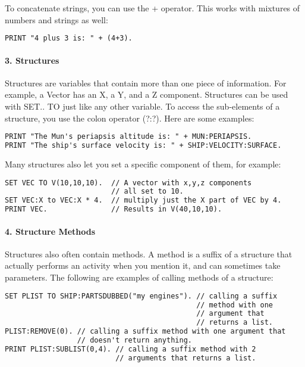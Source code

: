 To concatenate strings, you can use the + operator. This works with mixtures of numbers and strings as well:

\begin{lstlisting}[frame=single,language=XML]
PRINT "4 plus 3 is: " + (4+3).
\end{lstlisting}

\paragraph{3. Structures}
Structures are variables that contain more than one piece of information. For example, a Vector has an X, a Y, and a Z component. Structures can be used with SET.. TO just like any other variable. To access the sub-elements of a structure, you use the colon operator (?:?). Here are some examples:

\begin{lstlisting}[frame=single,language=XML]
PRINT "The Mun's periapsis altitude is: " + MUN:PERIAPSIS.
PRINT "The ship's surface velocity is: " + SHIP:VELOCITY:SURFACE.
\end{lstlisting}

Many structures also let you set a specific component of them, for example:

\begin{lstlisting}[frame=single,language=XML]
SET VEC TO V(10,10,10).  // A vector with x,y,z components
                         // all set to 10.
SET VEC:X to VEC:X * 4.  // multiply just the X part of VEC by 4.
PRINT VEC.               // Results in V(40,10,10).
\end{lstlisting}

\paragraph{4. Structure Methods}
Structures also often contain methods. A method is a suffix of a structure that actually performs an activity when you mention it, and can sometimes take parameters. The following are examples of calling methods of a structure:

\begin{lstlisting}[frame=single,language=XML]
SET PLIST TO SHIP:PARTSDUBBED("my engines"). // calling a suffix
                                             // method with one
                                             // argument that
                                             // returns a list.
PLIST:REMOVE(0). // calling a suffix method with one argument that
                 // doesn't return anything.
PRINT PLIST:SUBLIST(0,4). // calling a suffix method with 2
                          // arguments that returns a list.
\end{lstlisting}

